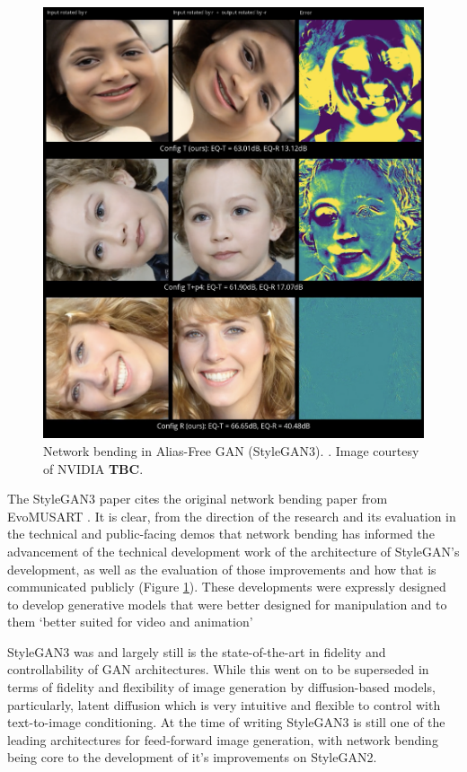  \begin{figure}[!htb]
    \centering
    \captionsetup{justification=centering}
    \includegraphics[width=1\textwidth]{figures/c7_impact/net-bend-technical/style-gan-rotations.png}
    \caption[Network bending in Alias-Free GAN (StyleGAN3)]{Network bending in Alias-Free GAN (StyleGAN3). \citep{karras2021alias}. Image courtesy of NVIDIA \textbf{TBC}.}
    \label{fig:c7:alias-free-gan}
\end{figure}

 The StyleGAN3 paper cites the original network bending paper from EvoMUSART \citep{broad2021network}.
 It is clear, from the direction of the research and its evaluation in the technical and public-facing demos that network bending has informed the advancement of the technical development work of the architecture of StyleGAN's development, as well as the evaluation of those improvements and how that is communicated publicly (Figure \ref{fig:c7:alias-free-gan}). 
 These developments were expressly designed to develop generative models that were better designed for manipulation and to them `better suited for video and animation' \citep{karras2021alias}

StyleGAN3 was and largely still is the state-of-the-art in fidelity and controllability of GAN architectures. 
While this went on to be superseded in terms of fidelity and flexibility of image generation by diffusion-based models, particularly, latent diffusion \citep{rombach2022high} which is very intuitive and flexible to control with text-to-image conditioning.
At the time of writing StyleGAN3 is still one of the leading architectures for feed-forward image generation, with network bending being core to the development of it's improvements on StyleGAN2. 

